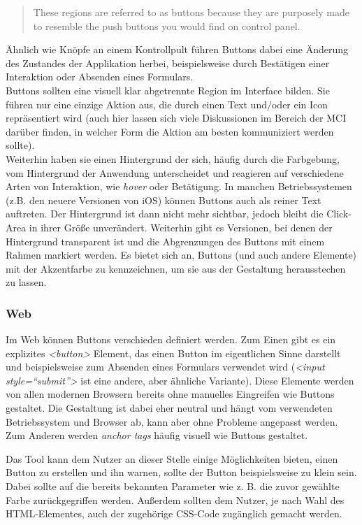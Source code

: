 \begin{quote}
These regions are referred to as buttons because they are purposely made to resemble the push buttons you would find on control panel. \cite{dix2009human}
\end{quote}

Ähnlich wie Knöpfe an einem Kontrollpult führen Buttons dabei eine Änderung des Zustandes der Applikation herbei, beispielsweise durch Bestätigen einer Interaktion oder Absenden eines Formulars. \\
Buttons sollten eine visuell klar abgetrennte Region im Interface bilden. Sie führen nur eine einzige Aktion aus, die durch einen Text und/oder ein Icon repräsentiert wird (auch hier lassen sich viele Diskussionen im Bereich der MCI darüber finden, in welcher Form die Aktion am besten kommuniziert werden sollte). \\
Weiterhin haben sie einen Hintergrund der sich, häufig durch die Farbgebung, vom Hintergrund der Anwendung unterscheidet und reagieren auf verschiedene Arten von Interaktion, wie \textit{hover} oder Betätigung.
In manchen Betriebssystemen (z.B. den neuere Versionen von iOS) können Buttons auch als reiner Text auftreten. Der Hintergrund ist dann nicht mehr sichtbar, jedoch bleibt die Click-Area in ihrer Größe unverändert. Weiterhin gibt es Versionen, bei denen der Hintergrund transparent ist und die Abgrenzungen des Buttons mit einem Rahmen markiert werden.
Es bietet sich an, Buttons (und auch andere Elemente) mit der Akzentfarbe zu kennzeichnen, um sie aus der Gestaltung herausstechen zu lassen.

\subsubsection{Web}
Im Web können Buttons verschieden definiert werden. Zum Einen gibt es ein explizites \textit{<button>} Element, das einen Button im eigentlichen Sinne darstellt und beispielsweise zum Absenden eines Formulars verwendet wird (\textit{<input style=“submit”>} ist eine andere, aber ähnliche Variante). Diese Elemente werden von allen modernen Browsern bereits ohne manuelles Eingreifen wie Buttons gestaltet. Die Gestaltung ist dabei eher neutral und hängt vom verwendeten Betriebssystem und Browser ab, kann aber ohne Probleme angepasst werden. \\
Zum Anderen werden \textit{anchor tags} häufig visuell wie Buttons gestaltet.

Das Tool kann dem Nutzer an dieser Stelle einige Möglichkeiten bieten, einen Button zu erstellen und ihn warnen, sollte der Button beispielsweise zu klein sein. Dabei sollte auf die bereits bekannten Parameter wie z. B. die zuvor gewählte Farbe zurückgegriffen werden. Außerdem sollten dem Nutzer, je nach Wahl des HTML-Elementes, auch der zugehörige CSS-Code zugänglich gemacht werden.


